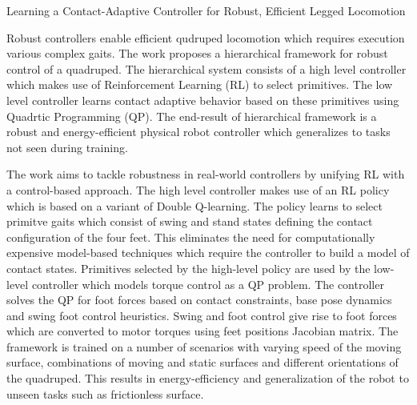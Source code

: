 \documentclass[11pt,letterpaper]{article}
\begin{document}
\begin{center}
  \large{Learning a Contact-Adaptive Controller for Robust,
  Efficient Legged Locomotion}
\end{center}

Robust controllers enable efficient qudruped locomotion which requires execution various complex gaits. The work proposes a hierarchical framework for robust control of a quadruped. The hierarchical system consists of a high level controller which makes use of Reinforcement Learning (RL) to select primitives. The low level controller learns contact adaptive behavior based on these primitives using Quadrtic Programming (QP). The end-result of hierarchical framework is a robust and energy-efficient physical robot controller which generalizes to tasks not seen during training.  

The work aims to tackle robustness in real-world controllers by unifying RL with a control-based approach. The high level controller makes use of an RL policy which is based on a variant of Double Q-learning. The policy learns to select primitve gaits which consist of swing and stand states defining the contact configuration of the four feet. This eliminates the need for computationally expensive model-based techniques which require the controller to build a model of contact states. Primitives selected by the high-level policy are used by the low-level controller which models torque control as a QP problem. The controller solves the QP for foot forces based on contact constraints, base pose dynamics and swing foot control heuristics. Swing and foot control give rise to foot forces which are converted to motor torques using feet positions Jacobian matrix. The framework is trained on a number of scenarios with varying speed of the moving surface, combinations of moving and static surfaces and different orientations of the quadruped. This results in energy-efficiency and generalization of the robot to unseen tasks such as frictionless surface.
\end{document}
